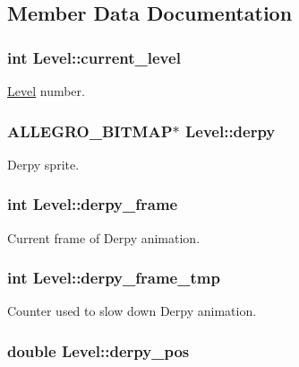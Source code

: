 \subsection{\-Member \-Data \-Documentation}
\hypertarget{structLevel_a1ba3ee0104c912dde5d6e70fee889512}{
\subsubsection[{current\-\_\-level}]{\setlength{\rightskip}{0pt plus 5cm}int {\bf \-Level\-::current\-\_\-level}}}\label{structLevel_a1ba3ee0104c912dde5d6e70fee889512}
\hyperlink{structLevel}{\-Level} number. \hypertarget{structLevel_ae33832497116b7a0c184959bbde21ee5}{
\subsubsection[{derpy}]{\setlength{\rightskip}{0pt plus 5cm}\-A\-L\-L\-E\-G\-R\-O\-\_\-\-B\-I\-T\-M\-A\-P$\ast$ {\bf \-Level\-::derpy}}}\label{structLevel_ae33832497116b7a0c184959bbde21ee5}
\-Derpy sprite. \hypertarget{structLevel_aab3e7d9746c741ce8e1a76df13be7c53}{
\subsubsection[{derpy\-\_\-frame}]{\setlength{\rightskip}{0pt plus 5cm}int {\bf \-Level\-::derpy\-\_\-frame}}}\label{structLevel_aab3e7d9746c741ce8e1a76df13be7c53}
\-Current frame of \-Derpy animation. \hypertarget{structLevel_aa6a30e7b31e2300936f8e97890e1817c}{
\subsubsection[{derpy\-\_\-frame\-\_\-tmp}]{\setlength{\rightskip}{0pt plus 5cm}int {\bf \-Level\-::derpy\-\_\-frame\-\_\-tmp}}}\label{structLevel_aa6a30e7b31e2300936f8e97890e1817c}
\-Counter used to slow down \-Derpy animation. \hypertarget{structLevel_a2bc3affc5c71ac8f6b9b775cefac0444}{
\subsubsection[{derpy\-\_\-pos}]{\setlength{\rightskip}{0pt plus 5cm}double {\bf \-Level\-::derpy\-\_\-pos}}}\label{structLevel_a2bc3affc5c71ac8f6b9b775cefac0444}
